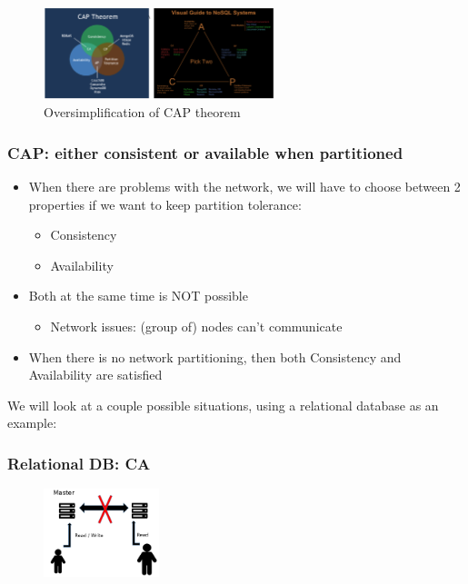 \documentclass{article}
\begin{document}
\begin{figure}[H]
    \centering
    \includegraphics[width=0.6\textwidth]{cap-theoreum.png}
    \caption{Oversimplification of CAP theorem}
\end{figure}

\subsubsection{CAP: either consistent or available when partitioned}

\begin{itemize}
    \item When there are problems with the network, we will have to choose between 2 properties if we want to keep partition tolerance:
    \begin{itemize}
        \item Consistency
        \item Availability
    \end{itemize}
    \item Both at the same time is NOT possible
    \begin{itemize}
        \item Network issues: (group of) nodes can't communicate
    \end{itemize}
    \item When there is no network partitioning, then both Consistency and Availability are satisfied
\end{itemize}

We will look at a couple possible situations, using a relational database as an example:

\subsubsection{Relational DB: CA}

\begin{figure}[H]
    \centering
    \includegraphics[width=0.3\textwidth]{cap-theorem-ca.png}
\end{figure}
\end{document}
